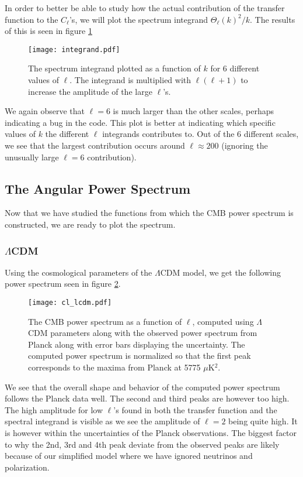 \documentclass[a4paper, 10pt, reqno]{amsart}
\begin{document}
In order to better be able to study how the actual contribution of the transfer function to the $C_\ell$'s, we will plot the spectrum integrand $\Theta_\ell (k)^2/k$. The results of this is seen in figure \ref{fig: integrand}
\begin{figure}
    \centering
    \texttt{[image: integrand.pdf]}
    \caption{The spectrum integrand plotted as a function of $k$ for 6 different values of $\ell$. The integrand is multiplied with $\ell(\ell +1)$ to increase the amplitude of the large $\ell$'s.}
    \label{fig: integrand}
\end{figure}
We again observe that $\ell = 6$ is much larger than the other scales, perhaps indicating a bug in the code. This plot is better at indicating which specific values of $k$ the different $\ell$ integrands contributes to. Out of the $6$ different scales, we see that the largest contribution occurs around $\ell \approx 200$ (ignoring the unusually large $\ell = 6$ contribution). 

\subsection{The Angular Power Spectrum}
Now that we have studied the functions from which the CMB power spectrum is constructed, we are ready to plot the spectrum. 
\subsubsection{$\Lambda$CDM}
Using the cosmological parameters of the $\Lambda$CDM model, we get the following power spectrum seen in figure \ref{fig: lcdm}.
\begin{figure}
    \centering
    \texttt{[image: cl\_lcdm.pdf]}
    \caption{The CMB power spectrum as a function of $\ell$, computed using $\Lambda$CDM parameters along with the observed power spectrum from Planck along with error bars displaying the uncertainty. The computed power spectrum is normalized so that the first peak corresponds to the maxima from Planck at 5775 $\mu$K$^2$.}
    \label{fig: lcdm}
\end{figure}
We see that the overall shape and behavior of the computed power spectrum follows the Planck data well. The second and third peaks are however too high. The high amplitude for low $\ell$'s found in both the transfer function and the spectral integrand is visible as we see the amplitude of $\ell = 2$ being quite high. It is however within the uncertainties of the Planck observations. The biggest factor to why the 2nd, 3rd and 4th peak deviate from the observed peaks are likely because of our simplified model where we have ignored neutrinos and polarization. 
\end{document}
